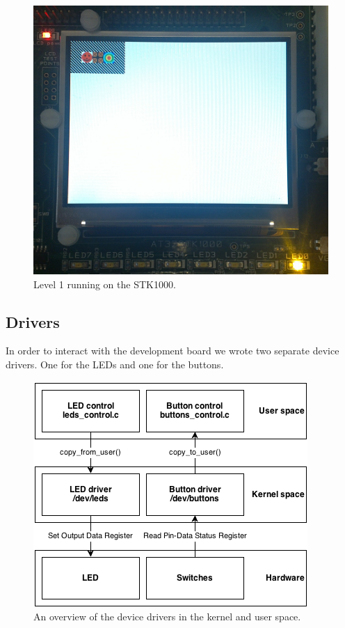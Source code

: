 \documentclass[a4paper,11pt]{article}
\begin{document}
\begin{figure}[H]
\centering
\includegraphics[scale=0.5]{images/level1.png}
\caption{Level 1 running on the STK1000.}
\label{fig:level1}
\end{figure}

\subsection{Drivers}
In order to interact with the development board we wrote two separate device drivers. One for the LEDs and one for the buttons. 

\begin{figure}[H]
\centering
\includegraphics[scale=0.5]{images/devicedrivers.png}
\caption{An overview of the device drivers in the kernel and user space.}
\label{fig:devicedrivers}
\end{figure}
\end{document}
